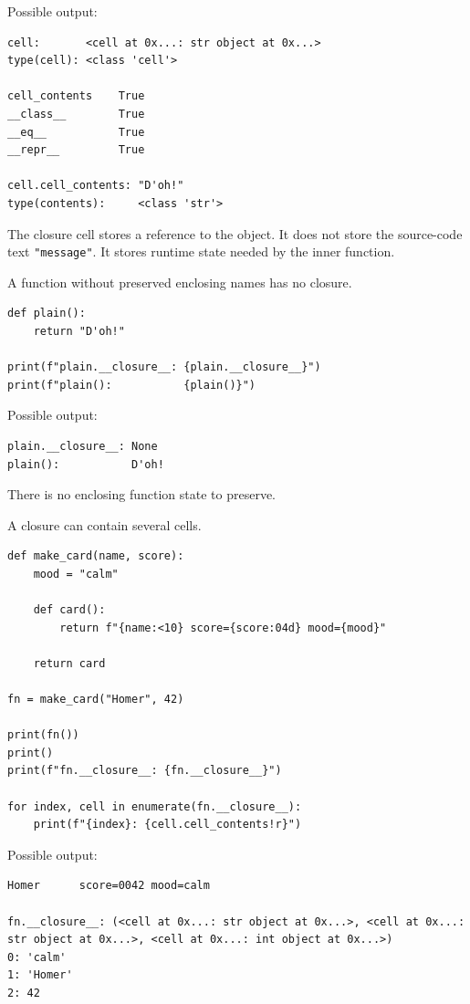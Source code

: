 Possible output:

\begin{verbatim}
cell:       <cell at 0x...: str object at 0x...>
type(cell): <class 'cell'>

cell_contents    True
__class__        True
__eq__           True
__repr__         True

cell.cell_contents: "D'oh!"
type(contents):     <class 'str'>
\end{verbatim}

The closure cell stores a reference to the object. It does not store the source-code text \texttt{"message"}. It stores runtime state needed by the inner function.

A function without preserved enclosing names has no closure.

\begin{verbatim}
def plain():
    return "D'oh!"

print(f"plain.__closure__: {plain.__closure__}")
print(f"plain():           {plain()}")
\end{verbatim}

Possible output:

\begin{verbatim}
plain.__closure__: None
plain():           D'oh!
\end{verbatim}

There is no enclosing function state to preserve.

A closure can contain several cells.

\begin{verbatim}
def make_card(name, score):
    mood = "calm"

    def card():
        return f"{name:<10} score={score:04d} mood={mood}"

    return card

fn = make_card("Homer", 42)

print(fn())
print()
print(f"fn.__closure__: {fn.__closure__}")

for index, cell in enumerate(fn.__closure__):
    print(f"{index}: {cell.cell_contents!r}")
\end{verbatim}

Possible output:

\begin{verbatim}
Homer      score=0042 mood=calm

fn.__closure__: (<cell at 0x...: str object at 0x...>, <cell at 0x...: str object at 0x...>, <cell at 0x...: int object at 0x...>)
0: 'calm'
1: 'Homer'
2: 42
\end{verbatim}

